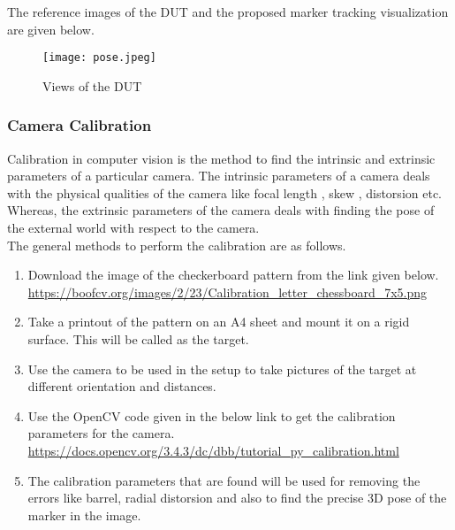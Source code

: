 \documentclass[10pt,a4paper]{article}
\begin{document}
The reference images of the DUT and the proposed marker tracking visualization are given below.

\begin{figure}[h]
	\centering
\texttt{[image: pose.jpeg]}
\caption{ Views of the DUT}
\end{figure}

\subsubsection{Camera Calibration}


Calibration in computer vision is the method to find the intrinsic and extrinsic parameters of a particular camera. The intrinsic parameters of a camera deals with the physical qualities of the camera like focal length , skew , distorsion etc. Whereas, the extrinsic parameters of the camera deals with finding the pose of the external world with respect to the camera.\\

The general methods to perform the calibration are as follows.

\begin{enumerate}
	\item
	Download the image of the checkerboard pattern from the link given below.
	\href{https://boofcv.org/images/2/23/Calibration_letter_chessboard_7x5.png}{https://boofcv.org/images/2/23/Calibration\_letter\_chessboard\_7x5.png}
	
	\item
	Take a printout of the pattern on an A4 sheet and mount it on a rigid surface. This will be called as the target.
	
	\item
	Use the camera to be used in the setup to take pictures of the target at different orientation and distances.
	
	\item
	Use the OpenCV code given in the below link to get the calibration parameters for the camera. 
	\href{https://docs.opencv.org/3.4.3/dc/dbb/tutorial_py_calibration.html}{https://docs.opencv.org/3.4.3/dc/dbb/tutorial\_py\_calibration.html}
	
	\item
	The calibration parameters that are found will be used for removing the errors like barrel, radial distorsion and also to find the precise 3D pose of the marker in the image.


\end{enumerate}
\end{document}
